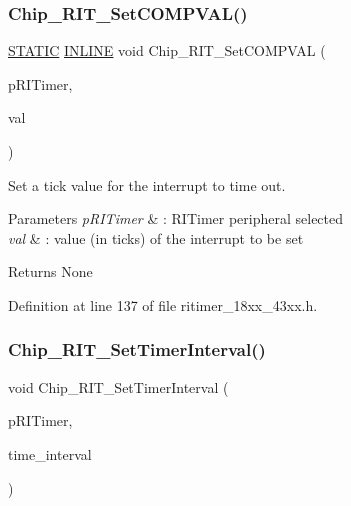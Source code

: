 \subsubsection{\texorpdfstring{Chip\+\_\+\+R\+I\+T\+\_\+\+Set\+C\+O\+M\+P\+V\+A\+L()}{Chip\_RIT\_SetCOMPVAL()}}
{\footnotesize\ttfamily \hyperlink{group___l_p_c___types___public___macros_ga10b2d890d871e1489bb02b7e70d9bdfb}{S\+T\+A\+T\+IC} \hyperlink{spifi__18xx__43xx_8h_a2eb6f9e0395b47b8d5e3eeae4fe0c116}{I\+N\+L\+I\+NE} void Chip\+\_\+\+R\+I\+T\+\_\+\+Set\+C\+O\+M\+P\+V\+AL (\begin{DoxyParamCaption}\item[{\hyperlink{struct_l_p_c___r_i_t_i_m_e_r___t}{L\+P\+C\+\_\+\+R\+I\+T\+I\+M\+E\+R\+\_\+T} $\ast$}]{p\+R\+I\+Timer,  }\item[{uint32\+\_\+t}]{val }\end{DoxyParamCaption})}



Set a tick value for the interrupt to time out. 


\begin{DoxyParams}{Parameters}
{\em p\+R\+I\+Timer} & \+: R\+I\+Timer peripheral selected \\
\hline
{\em val} & \+: value (in ticks) of the interrupt to be set \\
\hline
\end{DoxyParams}
\begin{DoxyReturn}{Returns}
None 
\end{DoxyReturn}


Definition at line 137 of file ritimer\+\_\+18xx\+\_\+43xx.\+h.

\mbox{\label{group___r_i_t_i_m_e_r__18_x_x__43_x_x_ga9473901c9e5ba4867c14597473cacf2b}} 
\subsubsection{\texorpdfstring{Chip\+\_\+\+R\+I\+T\+\_\+\+Set\+Timer\+Interval()}{Chip\_RIT\_SetTimerInterval()}}
{\footnotesize\ttfamily void Chip\+\_\+\+R\+I\+T\+\_\+\+Set\+Timer\+Interval (\begin{DoxyParamCaption}\item[{\hyperlink{struct_l_p_c___r_i_t_i_m_e_r___t}{L\+P\+C\+\_\+\+R\+I\+T\+I\+M\+E\+R\+\_\+T} $\ast$}]{p\+R\+I\+Timer,  }\item[{uint32\+\_\+t}]{time\+\_\+interval }\end{DoxyParamCaption})}



